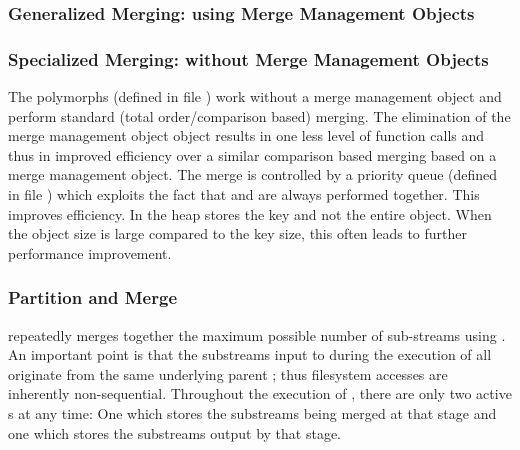 \tobeextended


%

\subsubsection{Generalized Merging: using Merge Management Objects}

\tobeextended


\subsubsection{Specialized Merging: without Merge Management Objects}

\tobeextended

The  polymorphs (defined in file
) work without a merge
management object and perform standard (total
order/comparison based) merging. The elimination of the
merge management object object results in one less level of
function calls and thus in improved efficiency over a
similar comparison based merging based on a merge management
object. The merge is controlled by a priority queue (defined
in file ) which exploits the
fact that  and  are always
performed together. This improves efficiency. In
  the heap stores the
key and not the entire object. When the object size is large
compared to the key size, this often leads to further
performance improvement.

\subsubsection{Partition and Merge}

\tobeextended

 repeatedly merges together the maximum
possible number of sub-streams using . An important point
is that the substreams input to  during the execution of
 all originate from the same underlying
parent ; thus filesystem accesses are inherently
non-sequential. Throughout the execution of
, there are only two active
s at any time: One which stores the substreams being
merged at that stage and one which stores the substreams output by that
stage.


